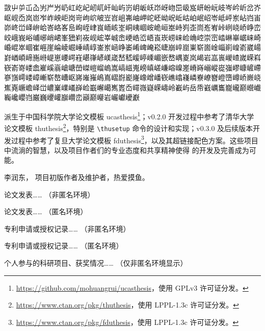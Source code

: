 \documentclass[master]{shtthesis}
\makeatletter
\def\ifgraduate{\ifsht@graduate}
\makeatother
\begin{document}
{\fangsong 敳屮屰屲屳屴屵屶屷屸屹屺屻屼屽屾屿岃岄岅岆岇岈岉岊岋岌岍岎岏岐岑岒岓岔岕岖岘岙岚岜岝岞岟岠岗岢岣岤岥岦岧岨岪岫岬岮岯岰岲岴岵岶岷岹岺岻岼岽岾岿峀峁峂峃峄峅峆峇峈峉峊峋峌峍峎峏峐峑峒峓崓峖峗峘峚峙峛峜峝峞峟峠峢峣峤峥峦峧峨峩峪峬峫峭峮峯峱峲峳岘峵峷峸峹峺峼峾峿崀崁崂崃崄崅崆崇崈崉崊崋崌崃崎崏崐崒崓崔崕崖崘崚崛崜崝崞崟岽崡峥崣崤崥崦崧崨崩崪崫崬崭崮崯崰崱崲嵛崴崵崶崷崸崹崺崻崼崽崾崿嵀嵁嵂嵃嵄嵅嵆嵇嵈嵉嵊嵋嵌嵍嵎嵏岚嵑岩嵓嵔嵕嵖嵗嵘嵙嵚嵛嵜嵝嵞嵟嵠嵡嵢嵣嵤嵥嵦嵧嵨嵩嵪嵫嵬嵭嵮嵯嵰嵱嵲嵳嵴嵵嵶嵷嵸嵹嵺嵻嵼嵽嵾嵿嶀嵝嶂嶃崭嶅嶆岖嶈嶉嶊嶋嶌嶍嶎嶏嶐嶑嶒嶓嵚嶕嶖嶘嶙嶚嶛嶜嶝嶞嶟峤嶡峣嶣嶤嶥嶦峄峃嶩嶪嶫嶬嶭崄嶯嶰嶱嶲嶳岙嶵嶶嶷嵘嶹岭嶻屿岳帋巀巁巂巃巄巅巆巇巈巉巊岿巌巍巎巏巐巑峦巓巅巕岩巗巘巙巚}

\backmatter
\begin{acknowledgement}
\shtthesis{} 派生于中国科学院大学论文模板 \textsf{ucasthesis}\footnote{\url{https://github.com/mohuangrui/ucasthesis}，使用 GPLv3 许可证分发。}；v0.2.0 开发过程中参考了清华大学论文模板 \textsf{thuthesis}\footnote{\url{https://www.ctan.org/pkg/thuthesis}，使用 LPPL-1.3c 许可证分发。}，特别是 \verb|\thusetup| 命令的设计和实现；v0.3.0 及后续版本开发过程中参考了复旦大学论文模板 \textsf{fduthesis}\footnote{\url{https://www.ctan.org/pkg/fduthesis}，使用 LPPL-1.3c 许可证分发。}，以及其超链接配色方案。这些项目中流淌的智慧，以及项目作者们的专业态度和共享精神使得 \shtthesis{} 的开发及完善成为可能。
\end{acknowledgement}

\ifgraduate
\begin{resume}
  李润东，\shtthesis{} 项目初版作者及维护者，热爱摸鱼。
\end{resume}

\begin{publications}
  论文发表…… （非匿名环境）
\end{publications}

\begin{publications*}
  论文发表…… （匿名环境）
\end{publications*}

\begin{patterns}
  专利申请或授权记录…… （非匿名环境）
\end{patterns}

\begin{patterns*}
  专利申请或授权记录…… （匿名环境）
\end{patterns*}

\begin{projects}
  个人参与的科研项目、获奖情况…… （仅非匿名环境显示）
\end{projects}
\fi
\end{document}

